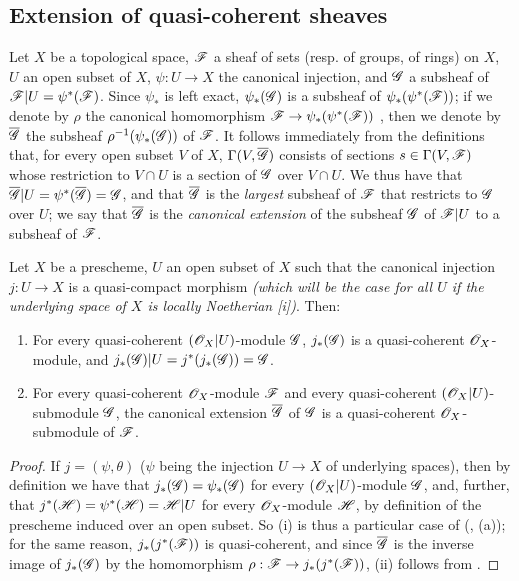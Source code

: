 \subsection{Extension of quasi-coherent sheaves}
\label{subsection-extension-of-qcoh}

\begin{env}[9.4.1]
\label{1.9.4.1}
Let
$X$ be a topological space, $\mathscr{F}$ a sheaf of sets (resp. of groups, of rings) on $X$, $U$
an open subset of $X$, $\psi:U\to X$ the canonical injection, and $\mathscr{G}$ a subsheaf of
$\mathscr{F}|U=\psi^*(\mathscr{F})$. Since $\psi_*$ is left exact, $\psi_*(\mathscr{G})$ is a subsheaf of
$\psi_*(\psi^*(\mathscr{F}))$; if we denote by $\rho$ the canonical homomorphism
$\sh{F}\to\psi_*(\psi^*(\sh{F}))$ , then we denote by $\overline{\mathscr{G}}$
the subsheaf $\rho^{-1}(\psi_*(\mathscr{G}))$ of $\mathscr{F}$. It follows immediately from the
definitions that, for every open subset $V$ of $X$, $\Gamma(V,\overline{\mathscr{G}})$ consists of
sections $s\in\Gamma(V,\mathscr{F})$ whose restriction to $V\cap U$ is a section of $\mathscr{G}$ over
$V\cap U$. We thus have that $\overline{\mathscr{G}}|U=\psi^*(\overline{\mathscr{G}})=\mathscr{G}$, and that
$\overline{\mathscr{G}}$ is the \emph{largest} subsheaf of $\mathscr{F}$ that restricts to $\mathscr{G}$
over $U$; we say that $\overline{\mathscr{G}}$ is the \emph{canonical extension} of the subsheaf
$\mathscr{G}$ of $\mathscr{F}|U$ to a subsheaf of $\mathscr{F}$.
\end{env}

\begin{prop}[9.4.2]
\label{1.9.4.2}
Let $X$ be a prescheme, $U$ an open subset of $X$ such that the canonical injection
$j:U\to X$ is a quasi-compact morphism \emph{(which will be the case for \emph{all} $U$ if
the underlying space of $X$ is \emph{locally Noetherian}
[i])}. Then:
\begin{enumerate}[label=\emph{(\roman*)}]
  \item For every quasi-coherent $(\mathscr{O}_X|U)$-module $\mathscr{G}$, $j_*(\mathscr{G})$
    is a quasi-coherent $\mathscr{O}_X$-module, and $j_*(\mathscr{G})|U=j^*(j_*(\mathscr{G}))=\mathscr{G}$.
  \item For every quasi-coherent $\mathscr{O}_X$-module $\mathscr{F}$ and every quasi-coherent
    $(\mathscr{O}_X|U)$-submodule $\mathscr{G}$, the canonical extension
    $\overline{\mathscr{G}}$ of $\mathscr{G}$  is a
    quasi-coherent $\mathscr{O}_X$-submodule of $\mathscr{F}$.
\end{enumerate}
\end{prop}

\begin{proof}
\label{proof-1.9.4.2}
If $j=(\psi,\theta)$ ($\psi$ being the injection $U\to X$ of underlying spaces), then by
definition we have that $j_*(\mathscr{G})=\psi_*(\mathscr{G})$ for every $(\mathscr{O}_X|U)$-module $\mathscr{G}$,
and, further, that $j^*(\mathscr{H})=\psi^*(\mathscr{H})=\mathscr{H}|U$ for every $\mathscr{O}_X$-module $\mathscr{H}$,
by definition of the prescheme induced over an open subset. So (i) is thus a particular case
of (, (a)); for the same reason, $j_*(j^*(\mathscr{F}))$ is quasi-coherent, and
since $\overline{\mathscr{G}}$ is the inverse image of $j_*(\mathscr{G})$ by the homomorphism
$\rho:\sh{F}\to j_*(j^*(\sh{F}))$, (ii) follows from .
\end{proof}

